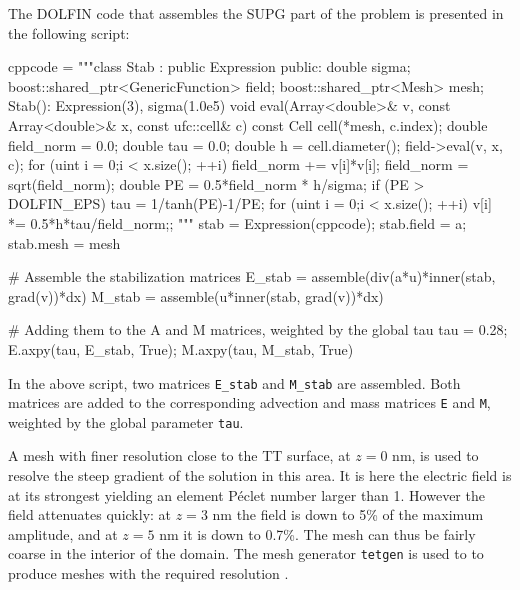The DOLFIN code that assembles the SUPG part of the problem is
presented in the following script:
\begin{python}
cppcode = """class Stab : public Expression {
public:
  double sigma; boost::shared_ptr<GenericFunction> field;
  boost::shared_ptr<Mesh> mesh;
  Stab(): Expression(3), sigma(1.0e5){}
  void eval(Array<double>& v, const Array<double>& x,
            const ufc::cell& c) const {
    Cell cell(*mesh, c.index);
    double field_norm = 0.0; double tau = 0.0;
    double h = cell.diameter();
    field->eval(v, x, c);
    for (uint i = 0;i < x.size(); ++i)
      field_norm += v[i]*v[i];
    field_norm = sqrt(field_norm);
    double PE = 0.5*field_norm * h/sigma;
    if (PE > DOLFIN_EPS)
      tau = 1/tanh(PE)-1/PE;
    for (uint i = 0;i < x.size(); ++i)
      v[i] *= 0.5*h*tau/field_norm;}};
"""
stab = Expression(cppcode); stab.field = a; stab.mesh = mesh

# Assemble the stabilization matrices
E_stab = assemble(div(a*u)*inner(stab, grad(v))*dx)
M_stab = assemble(u*inner(stab, grad(v))*dx)

# Adding them to the A and M matrices, weighted by the global tau
tau = 0.28; E.axpy(tau, E_stab, True); M.axpy(tau, M_stab, True)
\end{python}
In the above script, two matrices \texttt{E\_stab} and
\texttt{M\_stab} are assembled. Both matrices are added to the
corresponding advection and mass matrices \texttt{E} and \texttt{M},
weighted by the global parameter \texttt{tau}.

A mesh with finer resolution close to the TT surface, at $z=0$ nm, is
used to resolve the steep gradient of the solution in this area. It is
here the electric field is at its strongest yielding an element
P\'eclet number larger than 1. However the field attenuates quickly: at
$z=3$ nm the field is down to 5\% of the maximum amplitude, and at
$z=5$ nm it is down to 0.7\%. The mesh can thus be fairly coarse in
the interior of the domain. The mesh generator \texttt{tetgen} is used
to to produce meshes with the required resolution \citep{Si2007}.

